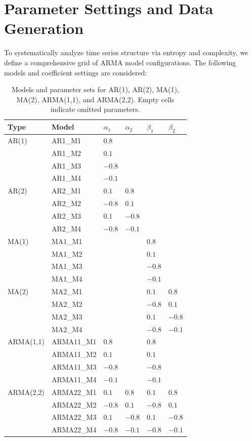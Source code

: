 \documentclass[12pt,a4paper]{article}
\begin{document}
\section{Parameter Settings and Data Generation}

To systematically analyze time series structure via entropy and complexity, we define a comprehensive grid of ARMA model configurations. The following models and coefficient settings are considered:

\begin{table}[h!]
	\centering
	\begin{tabular}{llllll}
		\toprule
		\textbf{Type} & \textbf{Model} & $\alpha_1$ & $\alpha_2$ & $\beta_1$ & $\beta_2$ \\
		\midrule
		AR(1)      & AR1\_M1  & $0.8$   &      &      &      \\
		& AR1\_M2  & $0.1$   &      &      &      \\
		& AR1\_M3  & $-0.8$  &      &      &      \\
		& AR1\_M4  & $-0.1$  &      &      &      \\
		AR(2)      & AR2\_M1  & $0.1$   & $0.8$  &      &      \\
		& AR2\_M2  & $-0.8$  & $0.1$  &      &      \\
		& AR2\_M3  & $0.1$   & $-0.8$ &      &      \\
		& AR2\_M4  & $-0.8$  & $-0.1$ &      &      \\
		MA(1)      & MA1\_M1  &       &      & $0.8$  &      \\
		& MA1\_M2  &       &      & $0.1$  &      \\
		& MA1\_M3  &       &      & $-0.8$ &      \\
		& MA1\_M4  &       &      & $-0.1$ &      \\
		MA(2)      & MA2\_M1  &       &      & $0.1$  & $0.8$  \\
		& MA2\_M2  &       &      & $-0.8$ & $0.1$  \\
		& MA2\_M3  &       &      & $0.1$  & $-0.8$ \\
		& MA2\_M4  &       &      & $-0.8$ & $-0.1$ \\
		ARMA(1,1)  & ARMA11\_M1 & $0.8$ &      & $0.8$  &      \\
		& ARMA11\_M2 & $0.1$ &      & $0.1$  &      \\
		& ARMA11\_M3 & $-0.8$ &     & $-0.8$ &      \\
		& ARMA11\_M4 & $-0.1$ &     & $-0.1$ &      \\
		ARMA(2,2)  & ARMA22\_M1 & $0.1$ & $0.8$  & $0.1$  & $0.8$  \\
		& ARMA22\_M2 & $-0.8$ & $0.1$ & $-0.8$ & $0.1$  \\
		& ARMA22\_M3 & $0.1$ & $-0.8$ & $0.1$  & $-0.8$ \\
		& ARMA22\_M4 & $-0.8$ & $-0.1$ & $-0.8$ & $-0.1$ \\
		\bottomrule
	\end{tabular}
	\caption{Models and parameter sets for AR(1), AR(2), MA(1), MA(2), ARMA(1,1), and ARMA(2,2). Empty cells indicate omitted parameters.}
\end{table}
\end{document}
